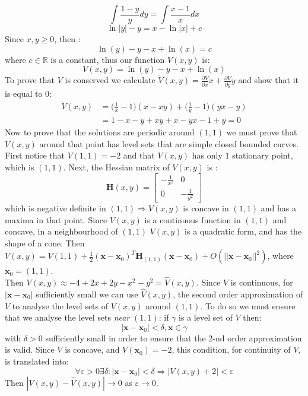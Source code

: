 \begin{enumerate}
{$$\int \frac{1-y}{y} dy = \int \frac{x-1}{x}dx$$
$$\ln|y|-y=x-\ln|x|+c$$
Since $x,y \geq 0$, then :
$$\ln(y)-y-x+\ln(x) = c$$
where $c \in \mathbb{R}$ is a constant, thus our function $V(x,y)$ is:
$$V(x,y)=\ln(y)-y-x+\ln(x)$$
To prove that $V$ is conserved we calculate $\dot{V}(x,y) = \frac{\partial V}{\partial x}\dot{x}+ \frac{\partial V}{\partial y}\dot{y}$ and show that it is equal to 0:
\begin{align*}
\dot{V}(x,y)&= \Big(\frac{1}{x}-1\Big)(x-xy)+\Big(\frac{1}{y}-1\Big)(yx-y)\\
&= 1-x-y+xy+x-yx-1+y = 0
\end{align*}
 Now to prove that the solutions are periodic around $(1,1)$ we must prove that $V(x,y)$ around that point has level sets that are simple closed bounded curves. \\ 
First notice that $V(1,1) = -2$ and that $V(x,y)$ has only $1$ stationary point, which is $(1,1)$. Next, the Hessian matrix of $V(x,y)$ is :
$$
 \mathbf{H}(x,y)=
    \left[\begin{array}{cc}
   -\frac{1}{x^2}  & 0\\
    0 & -\frac{1}{y^2}
    \end{array}\right]
    $$
which is negative definite in $(1,1) \Rightarrow V(x,y)$ is concave in $(1,1)$ and has a maxima in that point. Since $V(x,y)$ is a continuous function in $(1,1)$ and concave, in a neighbourhood of $(1,1)$ $V(x,y)$ is a quadratic form, and has the shape of a cone. Then $V(x,y) = V(1,1) + \frac{1}{2}(\mathbf{x}-\mathbf{x}_0)^T\mathbf{H}_{(1,1)}(\mathbf{x}-\mathbf{x}_0)+O(||\mathbf{x}-\mathbf{x}_0||^2)$, where $\mathbf{x}_0=(1,1)$.\\ Then $V(x,y) \approx -4+2x+2y-x^2-y^2=\hat{V}(x,y)$. Since $V$ is continuous,  for $|\mathbf{x}-\mathbf{x}_0|$ sufficiently small  we can use $\hat{V}(x,y)$, the second order approximation of $V$ to analyse the level sets of $V(x,y)$ around $(1,1)$. To do so we must ensure that we analyse the level sets \textit{near} $(1,1)$: if $\gamma$ is a level set of $V$ then: $$|\mathbf{x}-\mathbf{x}_0|<\delta, \mathbf{x} \in \gamma$$ with $\delta> 0$ sufficiently small in order to ensure that the 2-nd order approximation is valid. Since $V$ is concave, and $V(\mathbf{x}_0)=-2$, this condition, for continuity of $V$, is translated into:
$$\forall \varepsilon > 0 \exists \delta :|\mathbf{x}-\mathbf{x}_0|<\delta \Rightarrow |V(x,y)+2 |<\varepsilon$$
Then $|V(x,y)-\hat{V}(x,y)| \to 0$ as $\varepsilon \to 0$.
}
\end{enumerate}

